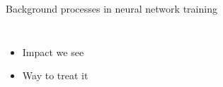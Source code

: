 \begin{frame}{Background processes in neural network training}
    \begin{columns}
        \begin{column}{0.5\textwidth}
            \begin{figure}
                \centering
            \end{figure}
        \end{column}
        \begin{column}{0.5\textwidth}
            \begin{figure}
                \centering
            \end{figure}
        \end{column}
    \end{columns}
    \begin{itemize}
        \item Impact we see
        \item Way to treat it
    \end{itemize}
\end{frame}